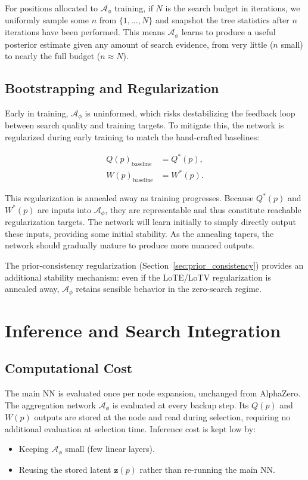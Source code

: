\documentclass[11pt]{article}
\begin{document}
For positions allocated to $\mathcal{A}_\phi$ training, if $N$ is the search
budget in iterations, we uniformly sample some $n$ from $\{1, \ldots, N\}$
and snapshot the tree statistics after $n$ iterations have been performed.
This means $\mathcal{A}_\phi$ learns to produce a useful posterior estimate
given any amount of search evidence, from very little ($n$ small) to nearly
the full budget ($n \approx N$).

\subsection{Bootstrapping and Regularization}
\label{sec:bootstrap}

Early in training, $\mathcal{A}_\phi$ is uninformed, which risks destabilizing
the feedback loop between search quality and training targets. To mitigate
this, the network is regularized during early training to match the
hand-crafted baselines:

\begin{align*}
  Q(p)_{\text{baseline}} &= Q^*(p), \\
  W(p)_{\text{baseline}} &= W^*(p).
\end{align*}

This regularization is annealed away as training progresses. Because $Q^*(p)$
and $W^*(p)$ are inputs into $\mathcal{A}_\phi$, they are representable and
thus constitute reachable regularization targets. The network will learn
initially to simply directly output these inputs, providing some initial
stability. As the annealing tapers, the network should gradually mature to
produce more nuanced outputs.

The prior-consistency regularization (Section~\ref{sec:prior_consistency})
provides an additional stability mechanism: even if the LoTE/LoTV
regularization is annealed away, $\mathcal{A}_\phi$ retains sensible behavior
in the zero-search regime.

\section{Inference and Search Integration}

\subsection{Computational Cost}

The main NN is evaluated once per node expansion, unchanged from AlphaZero.
The aggregation network $\mathcal{A}_\phi$ is evaluated at every backup step.
Its $Q(p)$ and $W(p)$ outputs are stored at the node and read during
selection, requiring no additional evaluation at selection time. Inference
cost is kept low by:
\begin{itemize}[noitemsep]
  \item Keeping $\mathcal{A}_\phi$ small (few linear layers).
  \item Reusing the stored latent $\mathbf{z}(p)$ rather than re-running the
        main NN.
\end{itemize}
\end{document}
